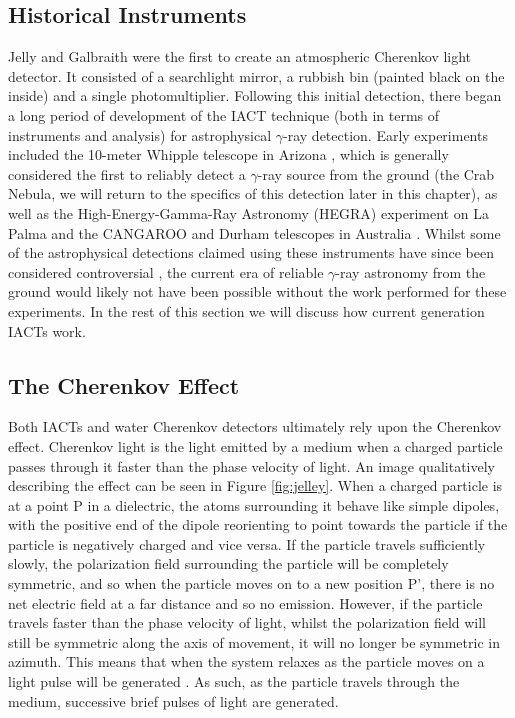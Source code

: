 \subsection{Historical Instruments}
Jelly and Galbraith \cite{G+J} were the first to create an atmospheric Cherenkov light detector. It consisted of a searchlight mirror, a rubbish bin (painted black on the inside) and a single photomultiplier. Following this initial detection, there began a long period of development of the IACT technique (both in terms of instruments and analysis) for astrophysical $\gamma$-ray detection. Early experiments included the 10-meter Whipple telescope in Arizona \cite{whipple}, which is generally considered the first to reliably detect a $\gamma$-ray source from the ground (the Crab Nebula, we will return to the specifics of this detection later in this chapter), as well as the High-Energy-Gamma-Ray Astronomy (HEGRA) experiment on La Palma \cite{HEGRA} and the CANGAROO and Durham telescopes in Australia \cite{CANGAROO} \cite{DURHAM}. Whilst some of the astrophysical detections claimed using these instruments have since been considered controversial \cite{hintonicrc30}, the current era of reliable $\gamma$-ray astronomy from the ground would likely not have been possible without the work performed for these experiments. In the rest of this section we will discuss how current generation IACTs work. 

\subsection{The Cherenkov Effect}
Both IACTs and water Cherenkov detectors ultimately rely upon the Cherenkov effect. Cherenkov light is the light emitted by a medium when a charged particle passes through it faster than the phase velocity of light. An image qualitatively describing the effect can be seen in Figure \ref{fig:jelley}. When a charged particle is at a point P in a dielectric, the atoms surrounding it behave like simple dipoles, with the positive end of the dipole reorienting to point towards the particle if the particle is negatively charged and vice versa. If the particle travels sufficiently slowly, the polarization field surrounding the particle will be completely symmetric, and so when the particle moves on to a new position P', there is no net electric field at a far distance and so no emission. However, if the particle travels faster than the phase velocity of light, whilst the polarization field will still be symmetric along the axis of movement, it will no longer be symmetric in azimuth. This means that when the system relaxes as the particle moves on a light pulse will be generated \cite{jelley}. As such, as the particle travels through the medium, successive brief pulses of light are generated. 

